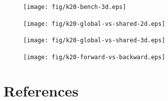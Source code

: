 \documentclass{elsarticle}
\begin{document}
\begin{figure}[h!]
\begin{center}
\texttt{[image: fig/k20-bench-3d.eps]}
\end{center}
\label{fig:k20-bench-3d}
\end{figure}

\begin{figure}[h!]
\begin{center}
\texttt{[image: fig/k20-global-vs-shared-2d.eps]}
\end{center}
\label{fig:k20-global-vs-shared-2d}
\end{figure}

\begin{figure}[h!]
\begin{center}
\texttt{[image: fig/k20-global-vs-shared-3d.eps]}
\end{center}
\label{fig:k20-global-vs-shared-3d}
\end{figure}

\begin{figure}[h!]
\begin{center}
\texttt{[image: fig/k20-forward-vs-backward.eps]}
\end{center}
\label{fig:k20-forward-vs-backward}
\end{figure}



\pagebreak
\section*{References}



\end{document}

